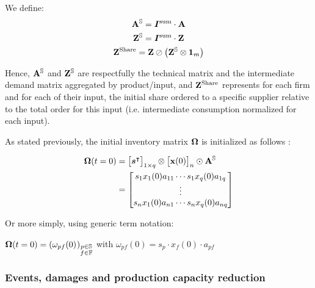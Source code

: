 \documentclass[main.tex]{subfiles}
\begin{document}
We define:
\begin{gather*}
  \mathbf{A}^{\mathbb{S}} = \bm{I^{\textrm{sum}}} \cdot  \mathbf{A}\\
  \mathbf{Z}^{\mathbb{S}} = \bm{I^{\textrm{sum}}} \cdot  \mathbf{Z}\\
  \mathbf{Z}^{\textrm{Share}} =  \mathbf{Z} \oslash \left ( \mathbf{Z}^{\mathbb{S}} \otimes
    \bm{1}_m \right )
\end{gather*}

Hence, $\mathbf{A}^{\mathbb{S}}$ and $\mathbf{Z}^{\mathbb{S}}$ are respectfully the
technical matrix and the intermediate demand matrix aggregated by
product/input, and $\mathbf{Z}^{\textrm{Share}}$ represents for each firm and for each of
their input, the initial share ordered to a specific supplier relative to the
total order for this input (i.e. intermediate consumption normalized for each
input).

As stated previously, the initial inventory matrix $\mathbf{\Omega}$ is initialized as follows :

\begin{equation*}
  \begin{aligned}
    \mathbf{\Omega}(t=0) & =
                  \begin{bmatrix}\bm{s}^\intercal\end{bmatrix}_{1 \times q}
                  \otimes
                  \begin{bmatrix} \mathbf{x}(0) \end{bmatrix}_{n} \odot \mathbf{A}^{\mathbb{S}} \\
                & =  \begin{bmatrix} s_1 x_1(0) a_{11} \cdots s_1 x_{q}(0) a_{1q}\\ \vdots\\ s_n x_{1}(0) a_{n1} \cdots s_n x_{q}(0) a_{nq} \end{bmatrix} 
  \end{aligned}
\end{equation*}

Or more simply, using generic term notation:

\begin{center}
  $\ioinv(t=0) = \mdefentry{\omega}[0][p][\sectorsset][f][\firmsset][][]$
  with $\omega_{pf}(0) = s_p \cdot x_{f}(0) \cdot a_{pf}$
\end{center}



\subsubsection{Events, damages and production capacity reduction}
\label{par:damages_sh}
\end{document}
